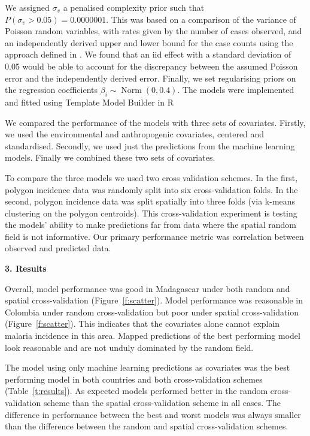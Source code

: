 \documentclass[11pt]{article}
\begin{document}
We assigned $\sigma_v$ a penalised complexity prior \citep{simpson2017penalising} such that $P(\sigma_v > 0.05) = 0.0000001$. This was based on a comparison of the variance of Poisson random variables, with rates given by the number of cases observed, and an independently derived upper and lower bound for the case counts using the approach defined in \citep{cibulskis2011worldwide}. We found that an iid effect with a standard deviation of 0.05 would be able to account for the discrepancy between the assumed Poisson error and the independently derived error.
Finally, we set regularising priors on the regression coefficients $\beta_i \sim \operatorname{ Norm}(0, 0.4)$. 
The models were implemented and fitted using Template Model Builder \citep{TMB} in R \citep{R}

We compared the performance of the models with three sets of covariates.
Firstly, we used the environmental and anthropogenic covariates, centered and standardised.
Secondly, we used just the predictions from the machine learning models.
Finally we combined these two sets of covariates.

To compare the three models we used two cross validation schemes. 
In the first, polygon incidence data was randomly split into six cross-validation folds.
In the second, polygon incidence data was split spatially into three folds (via k-means clustering on the polygon centroids).
This cross-validation experiment is testing the models’ ability to make predictions far from data where the spatial random field is not informative.
Our primary performance metric was correlation between observed and predicted data.


{\bf 3. Results}

Overall, model performance was good in Madagascar under both random and spatial cross-validation (Figure~\ref{f:scatter}).
Model performance was reasonable in Colombia under random cross-validation but poor under spatial cross-validation (Figure~\ref{f:scatter}).
This indicates that the covariates alone cannot explain malaria incidence in this area.
Mapped predictions of the best performing model look reasonable and are not unduly dominated by the random field.

The model using only machine learning predictions as covariates was the best performing model in both countries and both cross-validation schemes (Table~\ref{t:results}).
As expected models performed better in the random cross-validation scheme than the spatial cross-validation scheme in all cases.
The difference in performance between the best and worst models was always smaller than the difference between the random and spatial cross-validation schemes.
\end{document}
